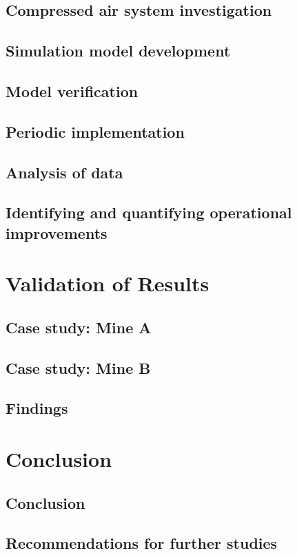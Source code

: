 \documentclass[12pt, english, oneside, singlespacing, open=any]{report}
\begin{document}
	\section{Compressed air system investigation}
	\section{Simulation model development}
	\section{Model verification}
	\section{Periodic implementation}
	\section{Analysis of data}
	\section{Identifying and quantifying operational improvements}
	
\chapter{Validation of Results}
	\section{Case study: Mine A}
	\section{Case study: Mine B}
	\section{Findings}

	
\chapter{Conclusion}
	 \section{Conclusion}
	 \section{Recommendations for further studies}
\end{document}
